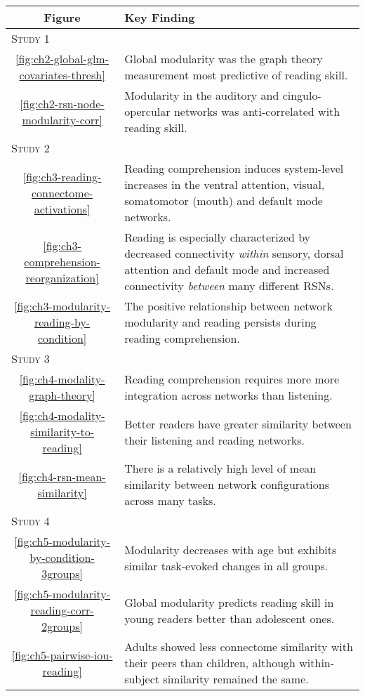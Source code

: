 \begin{tabular}{cp{10cm}}
\toprule 
Figure & Key Finding \\ 
\midrule 
\multicolumn{2}{l}{\textsc{Study 1}} \\
\ref{fig:ch2-global-glm-covariates-thresh} & Global modularity was the graph theory measurement most predictive of reading skill. \\ 
\ref{fig:ch2-rsn-node-modularity-corr} & Modularity in the auditory and cingulo-opercular networks was anti-correlated with reading skill.	\\ 
\multicolumn{2}{l}{\textsc{Study 2}} \\
\ref{fig:ch3-reading-connectome-activations} & Reading comprehension induces system-level increases in the ventral attention, visual, somatomotor (mouth) and default mode networks.	 \\ 
\ref{fig:ch3-comprehension-reorganization}  & Reading is especially characterized by decreased connectivity \textit{within} sensory, dorsal attention and default mode and increased connectivity \textit{between} many different RSNs.  \\ 
\ref{fig:ch3-modularity-reading-by-condition}  & The positive relationship between network modularity and reading persists during reading comprehension.  \\ 
\multicolumn{2}{l}{\textsc{Study 3}} \\
\ref{fig:ch4-modality-graph-theory}  & Reading comprehension requires more more integration across networks than listening. \\ 
\ref{fig:ch4-modality-similarity-to-reading} & Better readers have greater similarity between their listening and reading networks.\\
\ref{fig:ch4-rsn-mean-similarity} & There is a relatively high level of mean similarity between network configurations across many tasks.\\
\multicolumn{2}{l}{\textsc{Study 4}} \\
\ref{fig:ch5-modularity-by-condition-3groups} & Modularity decreases with age but exhibits similar task-evoked changes in all groups. \\
\ref{fig:ch5-modularity-reading-corr-2groups} & Global modularity predicts reading skill in young readers better than adolescent ones. \\
\ref{fig:ch5-pairwise-iou-reading} & Adults showed less connectome similarity with their peers than children, although within-subject similarity remained the same.\\
\bottomrule 
\end{tabular}